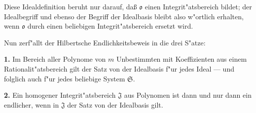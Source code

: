 \documentclass[12pt,a4paper]{article}
\begin{document}
Diese Idealdefinition beruht nur darauf, da{\ss} $\mathfrak{o}$ einen Integrit"{a}tsbereich
bildet; der Idealbegriff und ebenso der Begriff der Idealbasis bleibt
also w"{o}rtlich erhalten, wenn $\mathfrak{o}$ durch einen beliebigen Integrit"{a}tsbereich
ersetzt wird.

Nun zerf"{a}llt der Hilbertsche Endlichkeitsbeweis in die drei S"{a}tze:

\textbf{1.} Im Bereich aller Polynome von $m$ Unbestimmten mit Koeffizienten
aus einem Rationalit"{a}tsbereich gilt der Satz von der Idealbasis f"{u}r
jedes Ideal --- und folglich auch f"{u}r jedes beliebige System $\mathfrak{S}$.

\textbf{2.} Ein homogener Integrit"{a}tsbereich $\mathfrak{J}$ aus Polynomen ist dann und
nur dann ein endlicher, wenn in $\mathfrak{J}$ der Satz von der Idealbasis gilt.
\end{document}
